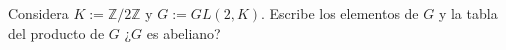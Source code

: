 \question
Considera $K:=\mathbb{Z}/2\mathbb{Z}$ y $G:=GL(2,K)$. Escribe los elementos de $G$ y la tabla del producto de $G$ ¿$G$ es abeliano?
